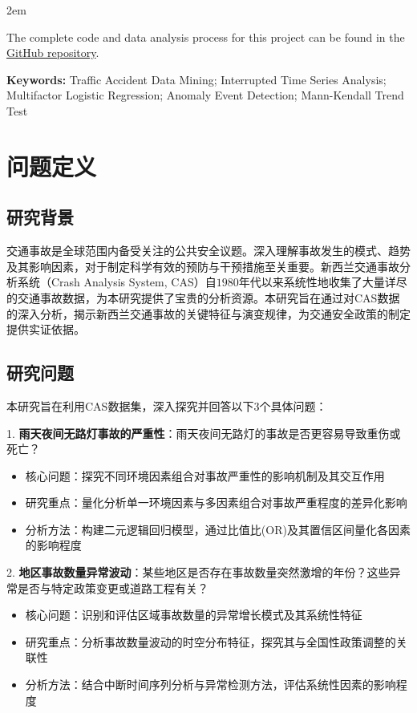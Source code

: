 \documentclass[12pt,a4paper]{article}
\newenvironment{enabstract}{
    \par\small
    \noindent\mbox{}\par\vspace{-\baselineskip}
    \par\parindent 2em
    }
    {\par\vspace{1em}}
\begin{document}
\begin{enabstract}
The complete code and data analysis process for this project can be found in the \href{https://github.com/Frederick2313072/kagglenewzealand}{GitHub repository}.

\vspace{1em}
\noindent\textbf{Keywords:} Traffic Accident Data Mining; Interrupted Time Series Analysis; Multifactor Logistic Regression; Anomaly Event Detection; Mann-Kendall Trend Test
\end{enabstract}

\clearpage
\tableofcontents
\clearpage

\section{问题定义}

\subsection{研究背景}

交通事故是全球范围内备受关注的公共安全议题。深入理解事故发生的模式、趋势及其影响因素，对于制定科学有效的预防与干预措施至关重要。新西兰交通事故分析系统（Crash Analysis System, CAS）自$1980$年代以来系统性地收集了大量详尽的交通事故数据，为本研究提供了宝贵的分析资源。本研究旨在通过对CAS数据的深入分析，揭示新西兰交通事故的关键特征与演变规律，为交通安全政策的制定提供实证依据。

\subsection{研究问题}

本研究旨在利用CAS数据集，深入探究并回答以下$3$个具体问题：

1. \textbf{雨天夜间无路灯事故的严重性}：雨天夜间无路灯的事故是否更容易导致重伤或死亡？
   \begin{itemize}
   \item 核心问题：探究不同环境因素组合对事故严重性的影响机制及其交互作用
   \item 研究重点：量化分析单一环境因素与多因素组合对事故严重程度的差异化影响
   \item 分析方法：构建二元逻辑回归模型，通过比值比(OR)及其置信区间量化各因素的影响程度
   \end{itemize}

2. \textbf{地区事故数量异常波动}：某些地区是否存在事故数量突然激增的年份？这些异常是否与特定政策变更或道路工程有关？
   \begin{itemize}
   \item 核心问题：识别和评估区域事故数量的异常增长模式及其系统性特征
   \item 研究重点：分析事故数量波动的时空分布特征，探究其与全国性政策调整的关联性
   \item 分析方法：结合中断时间序列分析与异常检测方法，评估系统性因素的影响程度
   \end{itemize}
\end{document}
